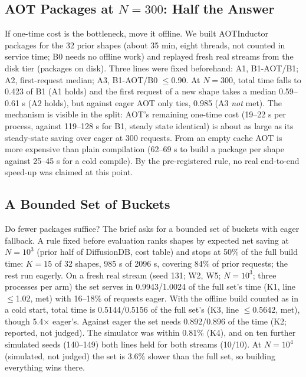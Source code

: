 \documentclass[conference]{IEEEtran}
\newcommand{\tn}[1]{#1}%
\begin{document}
\subsection{AOT Packages at $N{=}300$: Half the Answer}\label{sec:fail}
If one-time cost is the bottleneck, move it offline. We built AOTInductor~\cite{pt_aoti} packages for the 32 prior shapes (about \tn{35 min}, eight threads, not counted in service time; B0 needs no offline work) and replayed fresh real streams from the disk tier (packages on disk). Three lines were fixed beforehand: A1, B1-AOT/B1; A2, first-request median; A3, B1-AOT/B0 $\le$0.90. At $N{=}300$, total time falls to \tn{0.423} of B1 (A1 holds) and the first request of a new shape takes a median \tn{0.59--0.61 s} (A2 holds), but against eager AOT only ties, \tn{0.985} (A3 \emph{not} met). The mechanism is visible in the split: AOT's remaining one-time cost (\tn{19--22 s} per process, against \tn{119--128 s} for B1, steady state identical) is about as large as its steady-state saving over eager at 300 requests. From an empty cache AOT is more expensive than plain compilation (\tn{62--69 s} to build a package per shape against \tn{25--45 s} for a cold compile). By the pre-registered rule, no real end-to-end speed-up was claimed at this point.


\subsection{A Bounded Set of Buckets}
Do fewer packages suffice? The brief asks for a bounded set of buckets with eager fallback. A rule fixed before evaluation ranks shapes by expected net saving at $N{=}10^3$ (prior half of DiffusionDB, cost table) and stops at 50\% of the full build time: $K{=}15$ of 32 shapes, \tn{985 s} of \tn{2096 s}, covering \tn{84\%} of prior requests; the rest run eagerly. On a fresh real stream (seed 131; W2, W5; $N{=}10^3$; three processes per arm) the set serves in \tn{0.9943}/\tn{1.0024} of the full set's time (K1, line $\le$1.02, met) with \tn{16--18\%} of requests eager. With the offline build counted as in a cold start, total time is \tn{0.5144}/\tn{0.5156} of the full set's (K3, line $\le$0.5642, met), though \tn{5.4}$\times$ eager's. Against eager the set needs \tn{0.892}/\tn{0.896} of the time (K2; reported, not judged). The simulator was within \tn{0.81\%} (K4), and on ten further simulated seeds (140--149) both lines held for both streams (10/10). At $N{=}10^4$ (simulated, not judged) the set is \tn{3.6\%} slower than the full set, so building everything wins there.
\end{document}

